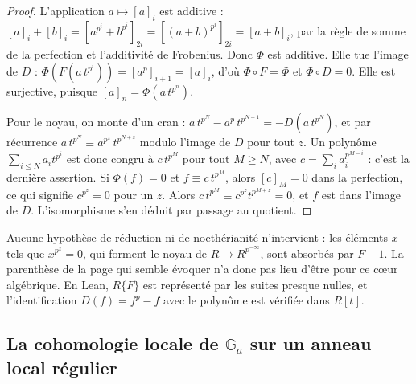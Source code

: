 \begin{proof}
L'application $a \mapsto [a]_i$ est additive : $[a]_i + [b]_i = [a^{p^i} + b^{p^i}]_{2i} = [(a + b)^{p^i}]_{2i} = [a + b]_i$, par la règle de somme de la perfection et l'additivité de Frobenius. Donc $\Phi$ est additive. Elle tue l'image de $D$ : $\Phi(F(a\,t^{p^i})) = [a^p]_{i+1} = [a]_i$, d'où $\Phi \circ F = \Phi$ et $\Phi \circ D = 0$. Elle est surjective, puisque $[a]_n = \Phi(a\,t^{p^n})$.

Pour le noyau, on monte d'un cran : $a\,t^{p^N} - a^p\,t^{p^{N+1}} = -D(a\,t^{p^N})$, et par récurrence $a\,t^{p^N} \equiv a^{p^z}\,t^{p^{N+z}}$ modulo l'image de $D$ pour tout $z$. Un polynôme $\sum_{i \leq N} a_i t^{p^i}$ est donc congru à $c\,t^{p^M}$ pour tout $M \geq N$, avec $c = \sum_i a_i^{p^{M-i}}$ : c'est la dernière assertion. Si $\Phi(f) = 0$ et $f \equiv c\,t^{p^M}$, alors $[c]_M = 0$ dans la perfection, ce qui signifie $c^{p^z} = 0$ pour un $z$. Alors $c\,t^{p^M} \equiv c^{p^z} t^{p^{M+z}} = 0$, et $f$ est dans l'image de $D$. L'isomorphisme s'en déduit par passage au quotient.
\end{proof}

\begin{remarque}
Aucune hypothèse de réduction ni de noethérianité n'intervient : les éléments $x$ tels que $x^{p^z} = 0$, qui forment le noyau de $R \to R^{p^{-\infty}}$, sont absorbés par $F - 1$. La parenthèse de la page qui semble évoquer  n'a donc pas lieu d'être pour ce cœur algébrique. En Lean, $R\{F\}$ est représenté par les suites presque nulles, et l'identification $D(f) = f^p - f$ avec le polynôme est vérifiée dans $R[t]$.
\end{remarque}

\subsection*{La cohomologie locale de $\mathbb G_a$ sur un anneau local régulier\protect{}}

